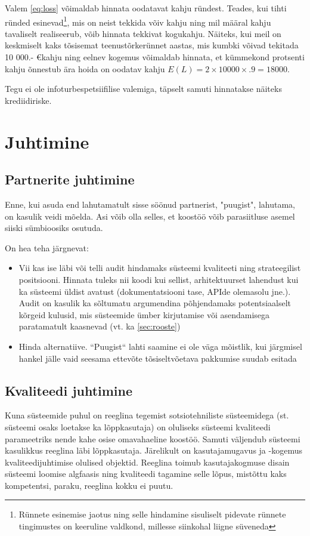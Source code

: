\documentclass{article}
\begin{document}
Valem \ref{eq:loss} võimaldab hinnata oodatavat kahju ründest. Teades, kui tihti ründed esinevad\footnote{Rünnete esinemise jaotus ning selle hindamine sisuliselt pidevate rünnete tingimustes on keeruline valdkond, millesse siinkohal liigne süveneda}, mis on neist tekkida võiv kahju ning mil määral kahju tavaliselt realiseerub, võib hinnata tekkivat kogukahju. Näiteks, kui meil on keskmiselt kaks tõsisemat teenustõrkerünnet aastas, mis kumbki võivad tekitada 10 000.- \euro kahju ning eelnev kogemus võimaldab hinnata, et kümmekond protsenti kahju õnnestub ära hoida on oodatav kahju $E(L)=2 \times 10000 \times .9 = 18 000$. 

Tegu ei ole infoturbespetsiifilise valemiga, täpselt samuti hinnatakse näiteks krediidiriske.

\section{Juhtimine}
\subsection{Partnerite juhtimine}
Enne, kui asuda end lahutamatult sisse söönud partnerist, "puugist", lahutama, on kasulik veidi mõelda. Asi võib olla selles, et koostöö võib parasiitluse asemel siiski sümbioosiks osutuda. 

On hea teha järgnevat:
\begin{itemize}
	\item Vii kas ise läbi või telli audit hindamaks süsteemi kvaliteeti ning strateegilist positsiooni. Hinnata tuleks nii koodi kui sellist, arhitektuurset lahendust kui ka süsteemi üldist avatust (dokumentatsiooni tase, APIde olemasolu jne.). Audit on kasulik ka sõltumatu argumendina põhjendamaks potentsiaalselt kõrgeid kulusid, mis süsteemide ümber kirjutamise või asendamisega paratamatult kaasnevad (vt. ka \ref{sec:rooste})
	\item Hinda alternatiive. ``Puugist`` lahti saamine ei ole väga mõistlik, kui järgmisel hankel jälle vaid seesama ettevõte tõsiseltvõetava pakkumise suudab esitada  
\end{itemize}

\subsection{Kvaliteedi juhtimine}
Kuna süsteemide puhul on reeglina tegemist sotsiotehniliste süsteemidega (st. süsteemi osaks loetakse ka lõppkasutaja) on oluliseks süsteemi kvaliteedi parameetriks nende kahe osise omavahaeline koostöö. Samuti väljendub süsteemi kasulikkus reeglina läbi lõppkasutaja. Järelikult on kasutajamugavus ja -kogemus kvaliteedijuhtimise olulised objektid. Reeglina toimub kasutajakogmuse disain süsteemi loomise algfaasis ning kvaliteedi tagamine selle lõpus, mistõttu kaks kompetentsi, paraku, reeglina kokku ei puutu.  
\end{document}
